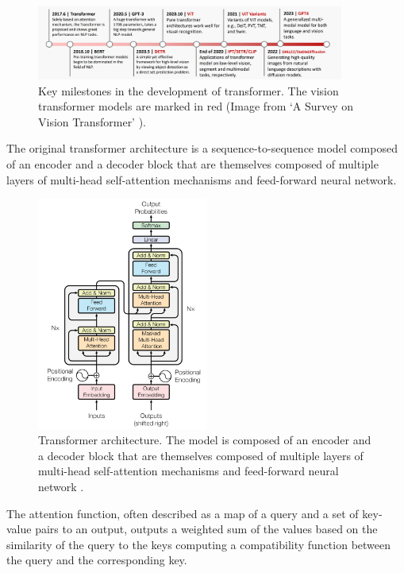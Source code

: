 \documentclass[english, 12pt, a4paper, elec, utf8, a-2b, online]{aaltothesis}
\begin{document}
\begin{figure}[H]
    \centering
    \includegraphics[width=0.9\textwidth]{images/transformers_milestones.png}
    \caption{Key milestones in the development of transformer. The vision transformer models are marked in red (Image from `A Survey on Vision Transformer' \cite{Han2023}).}
    \label{fig:transformers_milestones}
\end{figure}

The original transformer architecture \cite{Vaswani2017} is a sequence-to-sequence model composed of an encoder and a decoder block that are themselves composed of multiple layers of multi-head self-attention mechanisms and feed-forward neural network.

\begin{figure}[H]
    \centering
    \includegraphics[width=0.5\textwidth]{images/transformer_architecture.png}
    \caption{Transformer architecture. The model is composed of an encoder and a decoder block that are themselves composed of multiple layers of multi-head self-attention mechanisms and feed-forward neural network \cite{Vaswani2017}.}
    \label{fig:transformers_architecture}
\end{figure}

The attention function, often described as a map of a query and a set of key-value pairs to an output, outputs a weighted sum of the values based on the similarity of the query to the keys computing a compatibility function between the query and the corresponding key.
\end{document}
